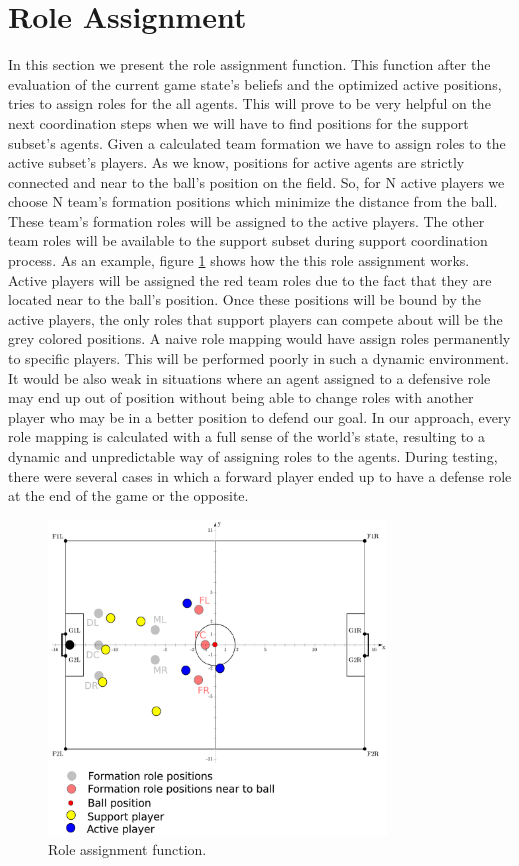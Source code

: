 \section{Role Assignment}
In this section we present the role assignment function. This function after the evaluation of the current game state's beliefs and the optimized active positions, tries to assign roles for the all agents. This will prove to be very helpful on the next coordination steps when we will have to find positions for the support subset's agents. Given a calculated team formation we have to assign roles to the active subset's players. As we know, positions for active agents are strictly connected and near to the ball's position on the field. So, for N active players we choose N team's formation positions which minimize the distance from the ball. These team's formation roles will be assigned to the active players. The other team roles will be available to the support subset during support coordination process. As an example, figure \ref{fig:RoleAss} shows how the this role assignment works. Active players will be assigned the red team roles due to the fact that they are located near to the ball's position. Once these positions will be bound by the active players, the only roles that support players can compete about will be the grey colored positions. A naive role mapping would have assign roles permanently to specific players. This will be performed poorly in such a dynamic environment. It would be also weak in situations where an agent assigned to a defensive role may end up out of position without being able to change roles with another player who may be in a better position to defend our goal. In our approach, every role mapping is calculated with a full sense of the world's state, resulting to a dynamic and unpredictable way of assigning roles to the agents. During testing, there were several cases in which a forward player ended up to have a defense role at the end of the game or the opposite.
\begin{figure}[htb!]
\centering
  \includegraphics[width=0.8\textwidth]{Chapter4/figures/RoleAss.pdf}
  \caption{Role assignment function.} 
  \label{fig:RoleAss}
\end{figure}


